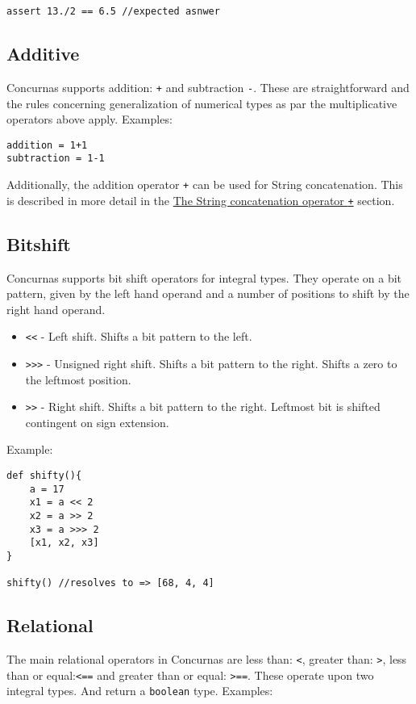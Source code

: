 \documentclass[conc-doc]{subfiles}
\begin{document}
\begin{lstlisting}
assert 13./2 == 6.5 //expected asnwer
\end{lstlisting}

\subsection{Additive}
Concurnas supports addition: \lstinline{+} and subtraction \lstinline{-}. These are straightforward and the rules concerning generalization of numerical types as par the multiplicative operators above apply. Examples:

\begin{lstlisting}
addition = 1+1
subtraction = 1-1
\end{lstlisting}

Additionally, the addition operator \lstinline{+} can be used for String concatenation. This is described in more detail in the \hyperref[subsec:StringConcat]{The String concatenation operator \lstinline!+!} section.

\subsection{Bitshift}
Concurnas supports bit shift operators for integral types. They operate on a bit pattern, given by the left hand operand and a number of positions to shift by the right hand operand.

\begin{itemize}
	\item \lstinline{<<} - Left shift. Shifts a bit pattern to the left.
	\item \lstinline{>>>} - Unsigned right shift. Shifts a bit pattern to the right. Shifts a zero to the leftmost position.
	\item \lstinline{>>} - Right shift. Shifts a bit pattern to the right. Leftmost bit is shifted contingent on sign extension.
\end{itemize}

Example:
\begin{lstlisting}
def shifty(){
	a = 17
	x1 = a << 2
	x2 = a >> 2
	x3 = a >>> 2
	[x1, x2, x3]
}

shifty() //resolves to => [68, 4, 4]
\end{lstlisting}

\subsection{Relational}
The main relational operators in Concurnas are less than: \lstinline{<}, greater than: \lstinline{>}, less than or equal:\lstinline{<==} and greater than or equal: \lstinline{>==}. These operate upon two integral types. And return a \lstinline{boolean} type. Examples:
\end{document}

